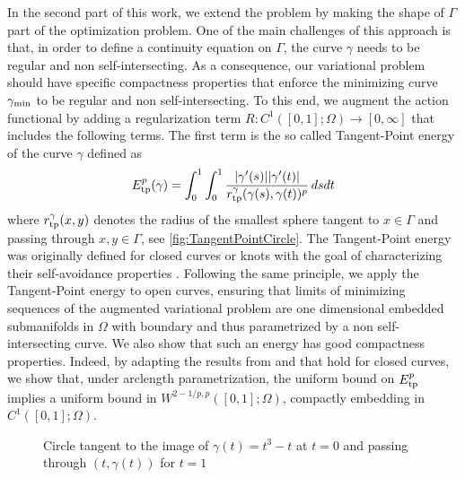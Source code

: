 \documentclass{article}
\begin{document}
In the second part of this work, we extend the problem by making the shape of $\Gamma$ part of the optimization problem. One of the main challenges of this approach is that, in order to define a continuity equation on $\Gamma$, the curve $\gamma$ needs to be regular and non self-intersecting. As a consequence, our variational problem should have specific compactness properties that enforce the minimizing curve $\gamma_{\rm min}$ to be regular and non self-intersecting. To this end, we augment the action functional by adding a regularization term $R : C^1([0,1];\Omega) \rightarrow [0,\infty]$ that includes the following terms. The first term is the so called Tangent-Point energy \cite{STRZELECKI_2012} of the curve $\gamma$ defined as 
\begin{align}
    E^p_{\rm tp}(\gamma) = \int_0^{1} \int_0^{1} \frac{|\gamma'(s)||\gamma'(t)|}{r_{\rm tp}^{\gamma}(\gamma(s), \gamma(t))^p} \, ds dt
\end{align}
where $r_{\rm tp}^{\gamma}(x,y)$ denotes the radius of the smallest sphere tangent to $x\in\Gamma$ and passing through $x,y\in\Gamma$, see \autoref{fig:TangentPointCircle}. 
The Tangent-Point energy was originally defined for closed curves or knots with the goal of characterizing their self-avoidance properties \cite{STRZELECKI_2012}. 
Following the same principle, we apply the Tangent-Point energy to open curves, ensuring that limits of minimizing sequences of the augmented variational problem are one dimensional embedded submanifolds in $\Omega$ with boundary and thus parametrized by a non self-intersecting curve.
We also show that such an energy has good compactness properties. Indeed, by adapting the results from \cite{Blatt2013} and \cite{blatt_regularity_2012} that hold for closed curves, we show that, under arclength parametrization, the uniform bound on $E^p_{\rm tp}$ implies a uniform bound in $W^{2-1/p,p}([0,1];\Omega)$, compactly embedding in $C^1([0,1];\Omega)$. 
\begin{figure}
    \centering
    \caption{Circle tangent to the image of $\gamma(t)=t^3-t$ at $t=0$ and passing through $(t,\gamma(t))$ for $t=1$ }
    \label{fig:TangentPointCircle}
\end{figure}
\end{document}
